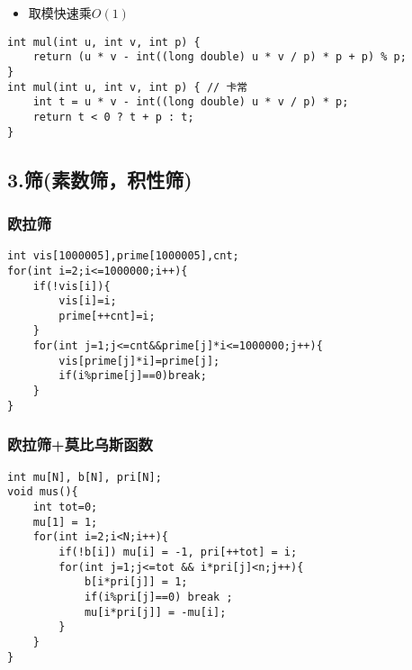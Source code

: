 \documentclass[]{article}
\providecommand{\tightlist}{%
  \setlength{\itemsep}{0pt}\setlength{\parskip}{0pt}}
\begin{document}
\begin{itemize}
\tightlist
\item
  取模快速乘\(O(1)\)
\end{itemize}

\begin{verbatim}
int mul(int u, int v, int p) {
    return (u * v - int((long double) u * v / p) * p + p) % p;
}
int mul(int u, int v, int p) { // 卡常
    int t = u * v - int((long double) u * v / p) * p;
    return t < 0 ? t + p : t;
}
\end{verbatim}

\hypertarget{ux7b5bux7d20ux6570ux7b5bux79efux6027ux7b5b}{%
\subsection{3.筛(素数筛，积性筛)}\label{ux7b5bux7d20ux6570ux7b5bux79efux6027ux7b5b}}

\hypertarget{ux6b27ux62c9ux7b5b}{%
\subsubsection{欧拉筛}\label{ux6b27ux62c9ux7b5b}}

\begin{verbatim}
int vis[1000005],prime[1000005],cnt;
for(int i=2;i<=1000000;i++){
    if(!vis[i]){
        vis[i]=i;
        prime[++cnt]=i;
    }
    for(int j=1;j<=cnt&&prime[j]*i<=1000000;j++){
        vis[prime[j]*i]=prime[j];
        if(i%prime[j]==0)break;
    }
}
\end{verbatim}

\hypertarget{ux6b27ux62c9ux7b5bux83abux6bd4ux4e4cux65afux51fdux6570}{%
\subsubsection{欧拉筛+莫比乌斯函数}\label{ux6b27ux62c9ux7b5bux83abux6bd4ux4e4cux65afux51fdux6570}}

\begin{verbatim}
int mu[N], b[N], pri[N];
void mus(){
    int tot=0; 
    mu[1] = 1;
    for(int i=2;i<N;i++){
        if(!b[i]) mu[i] = -1, pri[++tot] = i;
        for(int j=1;j<=tot && i*pri[j]<n;j++){
            b[i*pri[j]] = 1;
            if(i%pri[j]==0) break ;
            mu[i*pri[j]] = -mu[i];
        }
    }
}
\end{verbatim}
\end{document}
